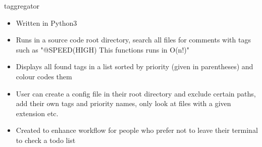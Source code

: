 \item taggregator
\begin{itemize}
    \item Written in Python3
    \item Runs in a source code root directory, search all files for comments with tags such as "@SPEED(HIGH) This functions runs in O(n!)"
    \item Displays all found tags in a list sorted by priority (given in parentheses) and colour codes them
    \item User can create a config file in their root directory and exclude certain paths, add their own tags and priority names, only look at files with a given extension etc.
    \item Created to enhance workflow for people who prefer not to leave their terminal to check a todo list
\end{itemize}
\bigbreak
